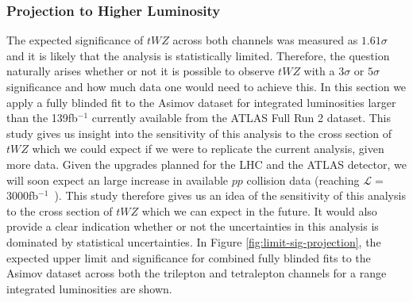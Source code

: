 \subsubsection{Projection to Higher Luminosity}

The expected significance of $tWZ$ across both channels was measured as $1.61\sigma$ and it is likely that the analysis is statistically limited. Therefore, the question naturally arises whether or not it is possible to observe $tWZ$ with a $3\sigma$ or $5\sigma$ significance and how much data one would need to achieve this. In this section we apply a fully blinded fit to the Asimov dataset for integrated luminosities larger than the 139fb$^{-1}$ currently available from the ATLAS Full Run 2 dataset. This study gives us insight into the sensitivity of this analysis to the cross section of $tWZ$ which we could expect if we were to replicate the current analysis, given more data. Given the upgrades planned for the LHC and the ATLAS detector, we will soon expect an large increase in available $pp$ collision data (reaching $\mathcal{L} =$ 3000fb$^{-1}$~\cite{HL-LHC-paper}). This study therefore gives us an idea of the sensitivity of this analysis to the cross section of $tWZ$ which we can expect in the future. It would also provide a clear indication whether or not the uncertainties in this analysis is dominated by statistical uncertainties. In Figure \ref{fig:limit-sig-projection}, the expected upper limit and significance for combined fully blinded fits to the Asimov dataset across both the trilepton and tetralepton channels for a range integrated luminosities are shown.
